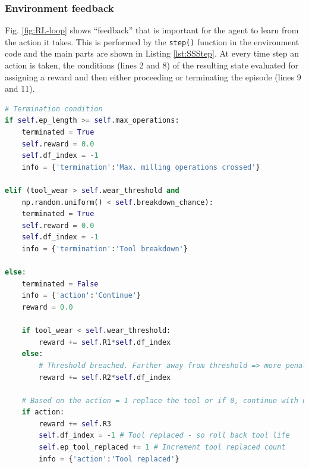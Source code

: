 \documentclass[a4paper, 12pt]{article}
\begin{document}
\subsubsection*{Environment feedback}
Fig. \ref{fig:RL-loop} shows ``feedback'' that is important for the agent to learn from the action it takes. This is performed by the \texttt{step()} function in the environment code and the main parts are shown in Listing \ref{lst:SSStep}. At every time step an action is taken, the conditions (lines 2 and 8) of the resulting state evaluated for assigning a reward and then either proceeding or terminating the episode (lines 9 and 11).

\begin{lstlisting}[language=Python, label={lst:SSStep}, caption={Environment: Important implementation details of the 'step' function}]
# Termination condition
if self.ep_length >= self.max_operations:
	terminated = True
	self.reward = 0.0
	self.df_index = -1
	info = {'termination':'Max. milling operations crossed'}

elif (tool_wear > self.wear_threshold and 
	np.random.uniform() < self.breakdown_chance):
	terminated = True
	self.reward = 0.0
	self.df_index = -1
	info = {'termination':'Tool breakdown'}

else:
	terminated = False
	info = {'action':'Continue'}
	reward = 0.0
	
	if tool_wear < self.wear_threshold:
		reward += self.R1*self.df_index
	else:
		# Threshold breached. Farther away from threshold => more penalty
		reward += self.R2*self.df_index 
		
	# Based on the action = 1 replace the tool or if 0, continue with normal operation
	if action:
		reward += self.R3 
		self.df_index = -1 # Tool replaced - so roll back tool life
		self.ep_tool_replaced += 1 # Increment tool replaced count
		info = {'action':'Tool replaced'}
\end{lstlisting}

\end{document}
